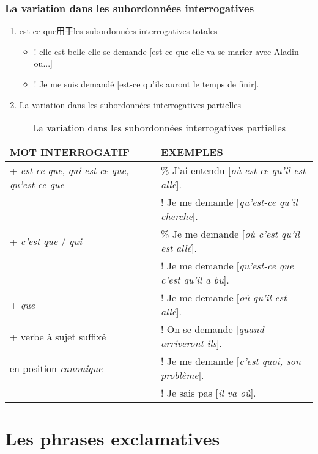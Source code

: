 \documentclass[UTF8]{report}
\begin{document}
\subsubsection{La variation dans les subordonnées interrogatives}
\begin{enumerate}
    \item est-ce que用于les subordonnées interrogatives totales
    \begin{itemize}
        \item ! elle est belle elle se demande [est ce que elle va se marier avec Aladin ou...]
        \item ! Je me suis demandé [est-ce qu’ils auront le temps de finir].
    \end{itemize}
    \item La variation dans les subordonnées interrogatives partielles
    
\end{enumerate}
\begin{table}[H]
        \begin{tabular}{|l|l|}
        \hline
        \rowcolor{cyan!20}
        \textbf{MOT INTERROGATIF} & \textbf{EXEMPLES} \\
        \hline
        + \textit{est-ce que}, \textit{qui est-ce que}, \textit{qu'est-ce que} & {\% J'ai entendu [\textit{où est-ce qu'il est allé}]}. \\
        & ! Je me demande [\textit{qu'est-ce qu'il cherche}]. \\
        \hline
        + \textit{c'est que} / \textit{qui} & {\% Je me demande [\textit{où c'est qu'il est allé}]}. \\
        & ! Je me demande [\textit{qu'est-ce que c'est qu'il a bu}]. \\
        \hline
        + \textit{que} & ! Je me demande [\textit{où qu'il est allé}]. \\
        \hline
        + verbe à sujet suffixé & ! On se demande [\textit{quand arriveront-ils}]. \\
        \hline
        en position \textit{canonique} & ! Je me demande [\textit{c'est quoi, son problème}]. \\
        & ! Je sais pas [\textit{il va où}]. \\
        \hline
        \end{tabular}
    \caption{La variation dans les subordonnées interrogatives partielles}
\end{table}

\section{Les phrases exclamatives}
\end{document}
